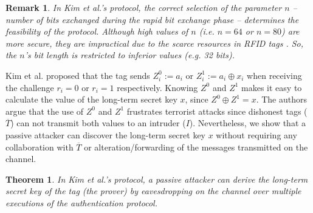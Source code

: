 \documentclass{article}
\newtheorem{theorem}{Theorem}\newtheorem{proposition}[theorem]{Proposition}
\newtheorem{remark}{Remark}
\begin{document}
\begin{remark}
In Kim et al.'s \cite{KimAKSP-2008-icisc} protocol, the correct selection of the parameter $n$ -- number of bits exchanged during the rapid bit exchange phase -- determines the feasibility of the protocol. Although high values of $n$ (i.e. $n=64$ or $n=80$) are more secure, they are impractical due to the scarce resources in RFID tags \cite{AvoineT-2009-isc}. So, the $n$'s bit length is restricted to inferior values (e.g. 32 bits).
\end{remark}


Kim et al. proposed that the tag sends $Z^0_i:=a_i$ or $Z^1_i:=a_i \oplus x_i$  when receiving the challenge $r_i = 0$ or  $r_i = 1$ respectively. Knowing $Z^0$ and $Z^1$ makes it easy to calculate the value of the long-term secret key $x$, since  $Z^0 \oplus Z^1 = x$. The authors argue that the use of  $Z^0$ and $Z^1$ frustrates terrorist attacks since dishonest tags ($\overline{T}$) can not transmit both values to an intruder ($I$). Nevertheless, we show that a passive attacker can discover the long-term secret key $x$ without requiring any collaboration with $\overline{T}$ or alteration/forwarding of the messages transmitted on the channel.

\begin{theorem}
In Kim et al.'s \cite{KimAKSP-2008-icisc} protocol, a passive attacker can derive the long-term secret key of the tag (the prover) by eavesdropping on the channel over multiple executions of the authentication protocol.
\end{theorem}
\end{document}

